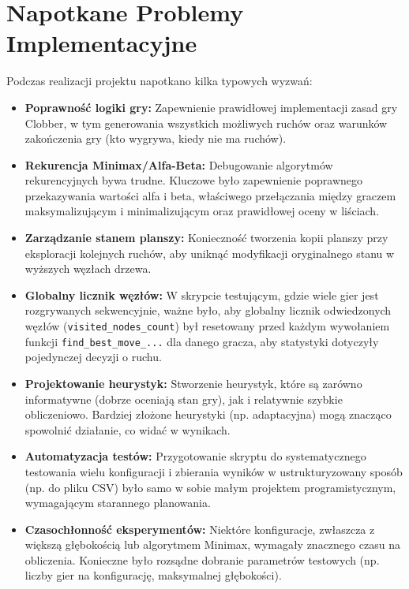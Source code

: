\documentclass[11pt,a4paper]{article}
\newcommand{\code}[1]{\texttt{#1}} %
\begin{document}
\section{Napotkane Problemy Implementacyjne}
Podczas realizacji projektu napotkano kilka typowych wyzwań:
\begin{itemize}
    \item \textbf{Poprawność logiki gry:} Zapewnienie prawidłowej implementacji zasad gry Clobber, w tym generowania wszystkich możliwych ruchów oraz warunków zakończenia gry (kto wygrywa, kiedy nie ma ruchów).
    \item \textbf{Rekurencja Minimax/Alfa-Beta:} Debugowanie algorytmów rekurencyjnych bywa trudne. Kluczowe było zapewnienie poprawnego przekazywania wartości alfa i beta, właściwego przełączania między graczem maksymalizującym i minimalizującym oraz prawidłowej oceny w liściach.
    \item \textbf{Zarządzanie stanem planszy:} Konieczność tworzenia kopii planszy przy eksploracji kolejnych ruchów, aby uniknąć modyfikacji oryginalnego stanu w wyższych węzłach drzewa.
    \item \textbf{Globalny licznik węzłów:} W skrypcie testującym, gdzie wiele gier jest rozgrywanych sekwencyjnie, ważne było, aby globalny licznik odwiedzonych węzłów (\code{visited\_nodes\_count}) był resetowany przed każdym wywołaniem funkcji \code{find\_best\_move\_...} dla danego gracza, aby statystyki dotyczyły pojedynczej decyzji o ruchu.
    \item \textbf{Projektowanie heurystyk:} Stworzenie heurystyk, które są zarówno informatywne (dobrze oceniają stan gry), jak i relatywnie szybkie obliczeniowo. Bardziej złożone heurystyki (np. adaptacyjna) mogą znacząco spowolnić działanie, co widać w wynikach.
    \item \textbf{Automatyzacja testów:} Przygotowanie skryptu do systematycznego testowania wielu konfiguracji i zbierania wyników w ustrukturyzowany sposób (np. do pliku CSV) było samo w sobie małym projektem programistycznym, wymagającym starannego planowania.
    \item \textbf{Czasochłonność eksperymentów:} Niektóre konfiguracje, zwłaszcza z większą głębokością lub algorytmem Minimax, wymagały znacznego czasu na obliczenia. Konieczne było rozsądne dobranie parametrów testowych (np. liczby gier na konfigurację, maksymalnej głębokości).
\end{itemize}
\end{document}
